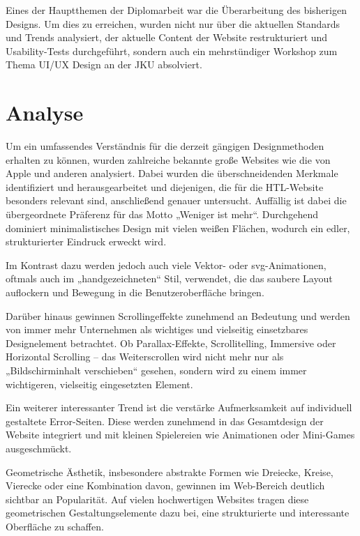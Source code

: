 Eines der Hauptthemen der Diplomarbeit war die Überarbeitung des bisherigen Designs. 
Um dies zu erreichen, wurden nicht nur über die aktuellen Standards und Trends analysiert, 
der aktuelle Content der Website restrukturiert und Usability-Tests durchgeführt, 
sondern auch ein mehrstündiger Workshop zum Thema UI/UX Design an der JKU absolviert.

\section{Analyse}
Um ein umfassendes Verständnis für die derzeit gängigen Designmethoden erhalten zu können, wurden zahlreiche bekannte große Websites wie die von Apple und anderen analysiert.
Dabei wurden die überschneidenden Merkmale identifiziert und herausgearbeitet und diejenigen, die für die HTL-Website besonders relevant sind, anschließend genauer untersucht. 
Auffällig ist dabei die übergeordnete Präferenz für das Motto „Weniger ist mehr“. Durchgehend dominiert minimalistisches Design mit vielen weißen Flächen, wodurch ein edler, strukturierter Eindruck erweckt wird.

Im Kontrast dazu werden jedoch auch viele Vektor- oder svg-Animationen, oftmals auch im „handgezeichneten“ Stil, verwendet, die das saubere Layout auflockern und Bewegung in die Benutzeroberfläche bringen. 

Darüber hinaus gewinnen Scrollingeffekte zunehmend an Bedeutung und werden von immer mehr Unternehmen als wichtiges und vielseitig einsetzbares Designelement betrachtet. 
Ob Parallax-Effekte, Scrollitelling, Immersive oder Horizontal Scrolling – das Weiterscrollen wird nicht mehr nur als „Bildschirminhalt verschieben“ gesehen, 
sondern wird zu einem immer wichtigeren, vielseitig eingesetzten Element. 

Ein weiterer interessanter Trend ist die verstärke Aufmerksamkeit auf individuell gestaltete
Error-Seiten. Diese werden zunehmend in das Gesamtdesign der Website integriert und mit kleinen 
Spielereien wie Animationen oder Mini-Games ausgeschmückt. 

Geometrische Ästhetik, insbesondere abstrakte Formen wie Dreiecke, 
Kreise, Vierecke oder eine Kombination davon, gewinnen im Web-Bereich deutlich sichtbar an Popularität. 
Auf vielen hochwertigen Websites tragen diese geometrischen Gestaltungselemente dazu bei, eine strukturierte und interessante Oberfläche zu schaffen. 


